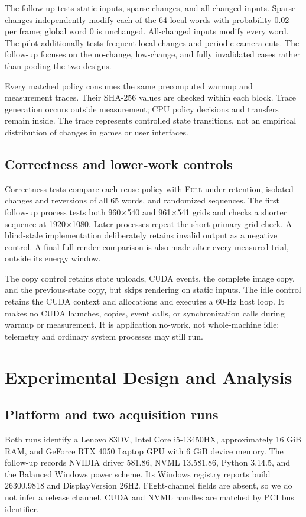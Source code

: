\documentclass[10pt,conference]{IEEEtran}
\newcommand{\Full}{\textsc{Full}}
\begin{document}
The follow-up tests static inputs, sparse changes, and all-changed inputs. Sparse changes independently modify each of the 64 local words with probability 0.02 per frame; global word 0 is unchanged. All-changed inputs modify every word. The pilot additionally tests frequent local changes and periodic camera cuts. The follow-up focuses on the no-change, low-change, and fully invalidated cases rather than pooling the two designs.

Every matched policy consumes the same precomputed warmup and measurement traces. Their SHA-256 values are checked within each block. Trace generation occurs outside measurement; CPU policy decisions and transfers remain inside. The trace represents controlled state transitions, not an empirical distribution of changes in games or user interfaces.

\subsection{Correctness and lower-work controls}
Correctness tests compare each reuse policy with \Full{} under retention, isolated changes and reversions of all 65 words, and randomized sequences. The first follow-up process tests both 960$\times$540 and 961$\times$541 grids and checks a shorter sequence at 1920$\times$1080. Later processes repeat the short primary-grid check. A blind-stale implementation deliberately retains invalid output as a negative control. A final full-render comparison is also made after every measured trial, outside its energy window.

The copy control retains state uploads, CUDA events, the complete image copy, and the previous-state copy, but skips rendering on static inputs. The idle control retains the CUDA context and allocations and executes a 60-Hz host loop. It makes no CUDA launches, copies, event calls, or synchronization calls during warmup or measurement. It is application no-work, not whole-machine idle: telemetry and ordinary system processes may still run.

\section{Experimental Design and Analysis}
\subsection{Platform and two acquisition runs}
Both runs identify a Lenovo 83DV, Intel Core i5-13450HX, approximately 16 GiB RAM, and GeForce RTX 4050 Laptop GPU with 6 GiB device memory. The follow-up records NVIDIA driver 581.86, NVML 13.581.86, Python 3.14.5, and the Balanced Windows power scheme. Its Windows registry reports build 26300.9818 and DisplayVersion 26H2. Flight-channel fields are absent, so we do not infer a release channel. CUDA and NVML handles are matched by PCI bus identifier.
\end{document}

